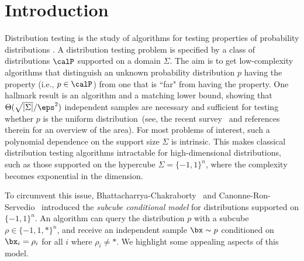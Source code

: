 
\section{Introduction}

Distribution testing is the study of algorithms for testing properties of probability distributions \cite{GR00, BFRSW00}. A distribution testing problem is specified by a class of distributions $\calP$ 
supported on a domain $\Sigma$.  The aim is to get low-complexity algorithms that distinguish an unknown probability distribution $p$ having the property (i.e., $p \in \calP$) 
from one that is ``far" from having the property. One hallmark result is an algorithm and a matching lower bound, showing that $\Theta(\sqrt{|\Sigma|} / \eps^2)$ independent samples are necessary and sufficient for testing whether $p$ is the uniform distribution~(see, the recent survey~\cite{C22} and references therein for an overview of the area). For most problems of interest, such a polynomial dependence on the support size $\Sigma$ is intrinsic. This makes classical distribution testing algorithms intractable for high-dimensional distributions, such as those supported on the hypercube $\Sigma = \{-1,1\}^n$, where the complexity becomes exponential in the dimension.

To circumvent this issue, Bhattacharrya-Chakraborty~\cite{BC18} and Canonne-Ron-Servedio~\cite{CRS15} introduced the \emph{subcube conditional model}
for distributions supported on $\{-1,1\}^n$. An algorithm can query the distribution $p$ with a subcube $\rho \in \{-1,1, *\}^n$, and receive an independent sample $\bx \sim p$ conditioned on $\bx_i = \rho_i$ for all $i$ where $\rho_i \neq *$. We highlight some appealing aspects of this model.

